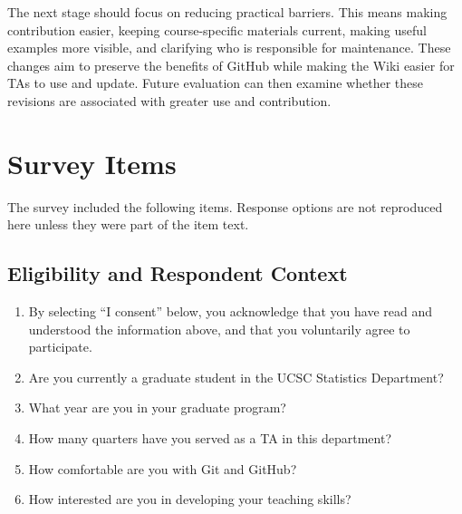 \documentclass[11pt]{article}
\begin{document}
The next stage should focus on reducing practical barriers. This means making contribution easier, keeping course-specific materials current, making useful examples more visible, and clarifying who is responsible for maintenance. These changes aim to preserve the benefits of GitHub while making the Wiki easier for TAs to use and update. Future evaluation can then examine whether these revisions are associated with greater use and contribution.




\clearpage
\appendix
\renewcommand{\thesection}{Appendix \Alph{section}}

\section{Survey Items}

The survey included the following items. Response options are not reproduced here unless they were part of the item text.

\subsection{Eligibility and Respondent Context}

\begin{enumerate}
  \item By selecting ``I consent'' below, you acknowledge that you have read and understood the information above, and that you voluntarily agree to participate.
  \item Are you currently a graduate student in the UCSC Statistics Department?
  \item What year are you in your graduate program?
  \item How many quarters have you served as a TA in this department?
  \item How comfortable are you with Git and GitHub?
  \item How interested are you in developing your teaching skills?
\end{enumerate}
\end{document}
